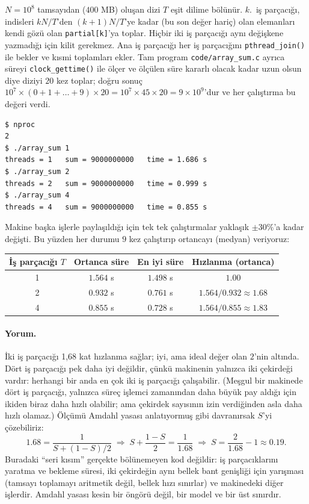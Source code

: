 \documentclass[11pt,a4paper]{article}
\newcommand{\cmd}[1]{\texttt{#1}}
\begin{document}


$N = 10^{8}$ tamsayıdan ($400$ MB) oluşan dizi $T$ eşit dilime bölünür. $k$.~iş parçacığı, indisleri $kN/T$'den $(k+1)N/T$'ye kadar (bu son değer hariç) olan elemanları kendi gözü olan \cmd{partial[k]}'ya toplar. Hiçbir iki iş parçacığı aynı değişkene yazmadığı için kilit gerekmez. Ana iş parçacığı her iş parçacığını \cmd{pthread\_join()} ile bekler ve kısmi toplamları ekler. Tam program \texttt{code/array\_sum.c} ayrıca süreyi \cmd{clock\_gettime()} ile ölçer ve ölçülen süre kararlı olacak kadar uzun olsun diye diziyi $20$ kez toplar; doğru sonuç $10^{7} \times (0+1+\dots+9) \times 20 = 10^{7}\times 45\times 20 = 9\times10^{9}$'dur ve her çalıştırma bu değeri verdi.

\begin{lstlisting}[style=term]
$ nproc
2
$ ./array_sum 1
threads = 1   sum = 9000000000   time = 1.686 s
$ ./array_sum 2
threads = 2   sum = 9000000000   time = 0.999 s
$ ./array_sum 4
threads = 4   sum = 9000000000   time = 0.855 s
\end{lstlisting}

Makine başka işlerle paylaşıldığı için tek tek çalıştırmalar yaklaşık $\pm 30\%$'a kadar değişti. Bu yüzden her durumu $9$ kez çalıştırıp ortancayı (medyan) veriyoruz:

\begin{center}
\renewcommand{\arraystretch}{1.3}
\begin{tabular}{@{}cccc@{}}
\toprule
\textbf{İş parçacığı $T$} & \textbf{Ortanca süre} & \textbf{En iyi süre} & \textbf{Hızlanma (ortanca)} \\
\midrule
1 & $1.564$ s & $1.498$ s & $1.00$ \\
2 & $0.932$ s & $0.761$ s & $1.564/0.932 \approx 1.68$ \\
4 & $0.855$ s & $0.728$ s & $1.564/0.855 \approx 1.83$ \\
\bottomrule
\end{tabular}
\end{center}

\paragraph{Yorum.} İki iş parçacığı 1,68 kat hızlanma sağlar; iyi, ama ideal değer olan $2$'nin altında. Dört iş parçacığı pek daha iyi değildir, çünkü makinenin yalnızca iki çekirdeği vardır: herhangi bir anda en çok iki iş parçacığı çalışabilir. (Meşgul bir makinede dört iş parçacığı, yalnızca süreç işlemci zamanından daha büyük pay aldığı için ikiden biraz daha hızlı olabilir; ama çekirdek sayısının izin verdiğinden asla daha hızlı olamaz.) Ölçümü Amdahl yasası anlatıyormuş gibi davranırsak $S$'yi çözebiliriz:
\[
1.68 = \frac{1}{S + (1-S)/2} \;\Longrightarrow\; S + \frac{1-S}{2} = \frac{1}{1.68} \;\Longrightarrow\; S = \frac{2}{1.68} - 1 \approx 0.19 .
\]
Buradaki ``seri kısım'' gerçekte bölünemeyen kod değildir: iş parçacıklarını yaratma ve bekleme süresi, iki çekirdeğin aynı bellek bant genişliği için yarışması (tamsayı toplamayı aritmetik değil, bellek hızı sınırlar) ve makinedeki diğer işlerdir. Amdahl yasası kesin bir öngörü değil, bir model ve bir üst sınırdır.
\end{document}
